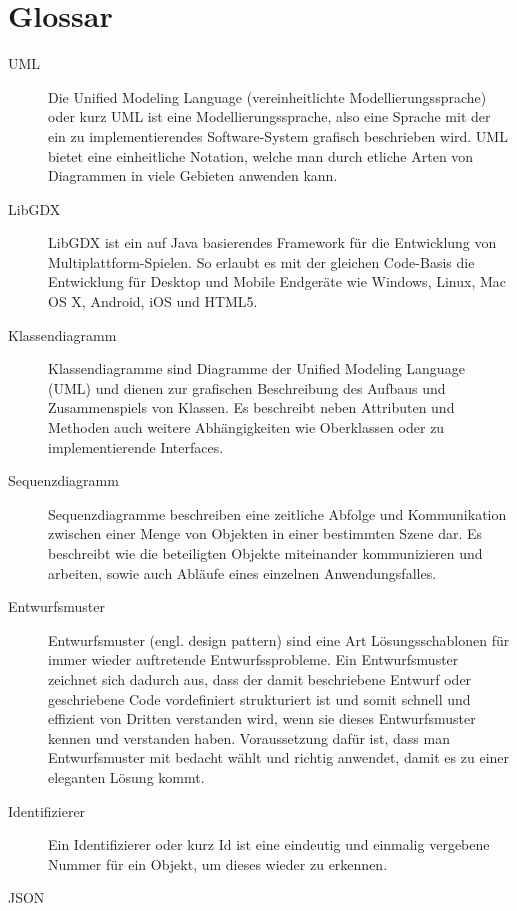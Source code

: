 \section{Glossar}
\begin{description}
\item[UML]
Die Unified Modeling Language (vereinheitlichte Modellierungssprache) oder kurz UML ist eine Modellierungssprache, also eine Sprache mit der ein zu implementierendes Software-System grafisch beschrieben wird.
UML bietet eine einheitliche Notation, welche man durch etliche Arten von Diagrammen in viele Gebieten anwenden kann.

\item[LibGDX]
LibGDX ist ein auf Java basierendes Framework für die Entwicklung von Multiplattform-Spielen. So erlaubt es mit der gleichen Code-Basis die Entwicklung für Desktop und Mobile Endgeräte wie Windows, Linux, Mac OS X, Android, iOS und HTML5. 

\item[Klassendiagramm]
Klassendiagramme sind Diagramme der Unified Modeling Language (UML) und dienen zur grafischen Beschreibung des Aufbaus und Zusammenspiels von Klassen.
Es beschreibt neben Attributen und Methoden auch weitere Abhängigkeiten wie Oberklassen oder zu implementierende Interfaces.

\item[Sequenzdiagramm]
Sequenzdiagramme beschreiben eine zeitliche Abfolge und Kommunikation zwischen einer Menge von Objekten in einer bestimmten Szene dar. Es beschreibt wie die beteiligten Objekte miteinander kommunizieren und arbeiten, sowie auch Abläufe eines einzelnen Anwendungsfalles.

\item[Entwurfsmuster]
Entwurfsmuster (engl. design pattern) sind eine Art Lösungsschablonen für immer wieder auftretende Entwurfssprobleme. Ein Entwurfsmuster zeichnet sich dadurch aus, dass der damit beschriebene Entwurf oder geschriebene Code vordefiniert strukturiert ist und somit schnell und effizient von Dritten verstanden wird, wenn sie dieses Entwurfsmuster kennen und verstanden haben. Voraussetzung dafür ist, dass man Entwurfsmuster mit bedacht wählt und richtig anwendet, damit es zu einer eleganten Lösung kommt.

\item[Identifizierer]
Ein Identifizierer oder kurz Id ist eine eindeutig und einmalig vergebene Nummer für ein Objekt, um dieses wieder zu erkennen.

\item[JSON]

\end{description}